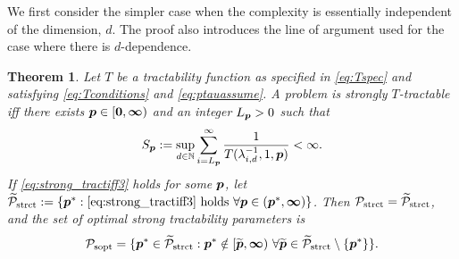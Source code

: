 \documentclass[sort&compress]{elsarticle}
\newtheorem{theorem}{Theorem}
\begin{document}
We first consider the simpler case when the complexity is essentially independent of the dimension, $d$.  The proof also introduces the line of argument used for the case where there is $d$-dependence.

\begin{theorem}\label{thm_main_strong_tract2}
Let $T$ be a tractability function as specified in \eqref{eq:Tspec} and satisfying \eqref{eq:Tconditions} and \eqref{eq:ptauassume}.  A problem is strongly $T$-tractable iff there exists $\boldsymbol{p} \in [\boldsymbol{0}, \boldsymbol{\infty})$ and an integer $L_{\boldsymbol{p}} > 0$ such that
\begin{equation} \label{eq:strong_tractiff3}
     S_{\boldsymbol{p}}:=\sup_{d \in \mathbb{N}} \sum_{i = L_{\boldsymbol{p}}}^\infty \frac{1}{T(\lambda_{i,d}^{-1},1,\boldsymbol{p})} < \infty.
\end{equation}
If \eqref{eq:strong_tractiff3} holds for some $\boldsymbol{p}$, let  $\widetilde{\mathcal{P}}_{\textup{strct}} : = \{\boldsymbol{p}^* : \eqref{eq:strong_tractiff3} \text{ holds }\forall \boldsymbol{p} \in (\boldsymbol{p}^*,\boldsymbol{\infty})\}$.  Then $\mathcal{P}_{\textup{strct}} = \widetilde{\mathcal{P}}_{\textup{strct}}$, and the set of optimal strong tractability parameters is
\[
	\mathcal{P}_{\textup{sopt}} =
	\{\boldsymbol{p}^* \in \widetilde{\mathcal{P}}_{\textup{strct}} :  \boldsymbol{p}^* \notin [\widetilde{\boldsymbol{p}},\boldsymbol{\infty}) \ \forall \widetilde{\boldsymbol{p}}\in  \widetilde{\mathcal{P}}_{\textup{strct}} \setminus \{\boldsymbol{p}^*\} \}.
\]
\end{theorem}
\end{document}
